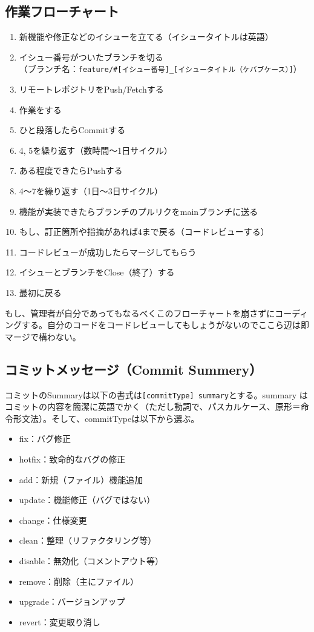 \documentclass[dvipdfmx,jb5]{jreport}
\newcommand{\terlogy}[2][|]{\colorbox{terlogy}{\texttt{\lstinline#1#2#1}}}
\begin{document}
\subsection{作業フローチャート}
\begin{enumerate}
      \item 新機能や修正などのイシューを立てる（イシュータイトルは英語）
      \item イシュー番号がついたブランチを切る\\
            （ブランチ名：\verb|feature/#[イシュー番号]_[イシュータイトル（ケバブケース）]|）
      \item リモートレポジトリをPush/Fetchする
      \item 作業をする
      \item ひと段落したらCommitする
      \item 4, 5を繰り返す（数時間〜1日サイクル）
      \item ある程度できたらPushする
      \item 4〜7を繰り返す（1日〜3日サイクル）
      \item 機能が実装できたらブランチのプルリクをmainブランチに送る
      \item もし、訂正箇所や指摘があれば4まで戻る（コードレビューする）
      \item コードレビューが成功したらマージしてもらう
      \item イシューとブランチをClose（終了）する
      \item 最初に戻る
\end{enumerate}
もし、管理者が自分であってもなるべくこのフローチャートを崩さずにコーディングする。自分のコードをコードレビューしてもしょうがないのでここら辺は即マージで構わない。
\subsection{コミットメッセージ（Commit Summery）}
コミットのSummaryは以下の書式は\terlogy{[commitType] summary}とする。summary はコミットの内容を簡潔に英語でかく（ただし動詞で、パスカルケース、原形＝命令形文法）。そして、commitTypeは以下から選ぶ。

\begin{itemize}
      \item fix：バグ修正
      \item hotfix：致命的なバグの修正
      \item add：新規（ファイル）機能追加
      \item update：機能修正（バグではない）
      \item change：仕様変更
      \item clean：整理（リファクタリング等）
      \item disable：無効化（コメントアウト等）
      \item remove：削除（主にファイル）
      \item upgrade：バージョンアップ
      \item revert：変更取り消し
\end{itemize}
\end{document}
